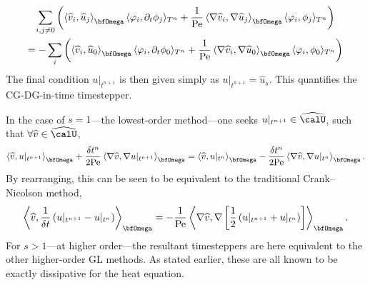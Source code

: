 \begin{example}
\begin{align}
        \end{align}
        \vspace{-8mm}
        \begin{multline}
            \sum_{i, j \neq 0}\left(\left\langle\widehat{v}_{i}, \widehat{u}_{j}\right\rangle_{\bfOmega}\langle\varphi_{i}, \partial_{t}\phi_{j}\rangle_{T^{n}} + \frac{1}{\rmPe}\left\langle\nabla\widehat{v}_{i}, \nabla\widehat{u}_{j}\right\rangle_{\bfOmega}\langle\varphi_{i}, \phi_{j}\rangle_{T^{n}}\right)  \\
            =  - \sum_{i}\left(\left\langle\widehat{v}_{i}, \widehat{u}_{0}\right\rangle_{\bfOmega}\langle\varphi_{i}, \partial_{t}\phi_{0}\rangle_{T^{n}} + \frac{1}{\rmPe}\left\langle\nabla\widehat{v}_{i}, \nabla\widehat{u}_{0}\right\rangle_{\bfOmega}\langle\varphi_{i}, \phi_{0}\rangle_{T^{n}}\right)
        \end{multline}
        The final condition $u|_{t^{n + 1}}$ is then given simply as $u|_{t^{n + 1}}  =  \widehat{u}_{s}$. This quantifies the CG-DG-in-time timestepper.
    \end{example}

    In the case of $s  =  1$---the lowest-order method---one seeks $u|_{t^{n + 1}}  \in  \widehat{\calU}$, such that $\forall \widehat{v}  \in  \widehat{\calU}$,
    \begin{equation}
        \left\langle\widehat{v}, u|_{t^{n + 1}}\right\rangle_{\bfOmega} + \frac{\delta t^{n}}{2\rmPe}\left\langle\nabla\widehat{v}, \nabla u|_{t^{n + 1}}\right\rangle_{\bfOmega}  =  \left\langle\widehat{v}, u|_{t^{n}}\right\rangle_{\bfOmega} - \frac{\delta t^{n}}{2\rmPe}\left\langle\nabla\widehat{v}, \nabla u|_{t^{n}}\right\rangle_{\bfOmega}.
    \end{equation}
    By rearranging, this can be seen to be equivalent to the traditional Crank--Nicolson method,
    \begin{equation}
        \left\langle\widehat{v}, \frac{1}{\delta t}\left(u|_{t^{n + 1}} - u|_{t^{n}}\right)\right\rangle_{\bfOmega}  =  - \frac{1}{\rmPe}\left\langle\nabla\widehat{v}, \nabla\left[\frac{1}{2}\left(u|_{t^{n + 1}} + u|_{t^{n}}\right)\right]\right\rangle_{\bfOmega}.
    \end{equation}
    For $s  >  1$---at higher order---the resultant timesteppers are here equivalent to the other higher-order GL methods. As stated earlier, these are all known to be exactly dissipative for the heat equation.
    
